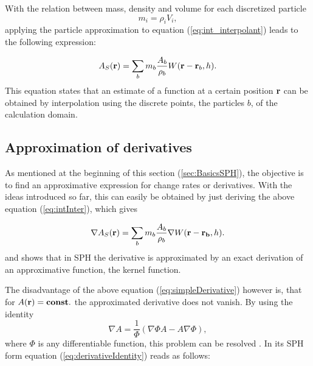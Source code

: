\documentclass{report}
\begin{document}
With the relation between mass, density and volume for each discretized particle
\begin{equation}
m_i=\rho_i V_i,
\end{equation}
applying the particle approximation to equation (\ref{eq:int_interpolant}) leads to the following expression:

\begin{equation}
\label{eq:intInter}
A_S({\bf r})=\sum_b m_b \frac{A_b}{\rho_b}W({\bf r}-{\bf r}_b,h).
\end{equation}
This equation states that an estimate of a function at a certain position ${\bf r}$ can be obtained by interpolation using the discrete points, the particles $b$, of the calculation domain. 


\subsection{Approximation of derivatives}

As mentioned at the beginning of this section (\ref{sec:BasicsSPH}), the objective is to find an approximative expression for change rates or derivatives.
With the ideas introduced so far, this can easily be obtained by just deriving the above equation (\ref{eq:intInter}), which gives~\cite{Monaghan2005, Liu2003} 

\begin{equation}
\label{eq:simpleDerivative}
\nabla A_S({\bf r})=\sum_b m_b \frac{A_b}{\rho_b}\nabla W({\bf r}-{\bf r_b},h).
\end{equation}
and shows that in SPH the derivative is approximated by an exact derivation of an approximative function, the kernel function.

The disadvantage of the above equation (\ref{eq:simpleDerivative}) however is, that for
$A(\bf{r})=const.$ the approximated derivative does not vanish. By using the identity
\begin{equation}
\label{eq:derivativeIdentity}
\nabla A = \frac{1}{\Phi}(\nabla {\Phi A}-A\nabla \Phi),
\end{equation}
where $\Phi$ is any differentiable function, this problem can be resolved \cite{Monaghan2005}. In its
SPH form equation (\ref{eq:derivativeIdentity}) reads as follows:
\end{document}
